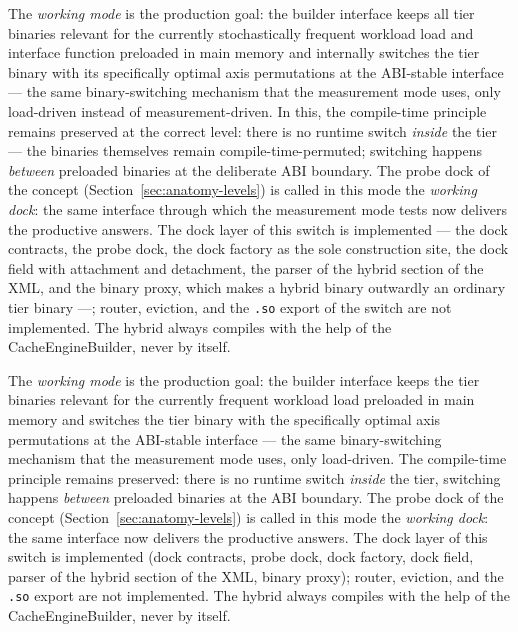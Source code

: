 \begin{nurlang}
The \emph{working mode} is the production goal: the builder interface keeps all tier binaries relevant for the currently
stochastically frequent workload load and interface function preloaded in
main memory and internally switches the tier binary with its specifically optimal
axis permutations at the ABI-stable interface --- the same binary-switching mechanism that the
measurement mode uses, only load-driven instead of measurement-driven. In this, the
compile-time principle remains preserved at the correct level: there is no runtime switch \emph{inside} the tier --- the binaries
themselves remain compile-time-permuted; switching happens \emph{between} preloaded binaries at
the deliberate ABI boundary. The probe dock of the concept (Section~\ref{sec:anatomy-levels}) is called in this
mode the \emph{working dock}: the same interface through which the measurement mode tests now delivers the
productive answers. The dock layer of this switch is implemented --- the dock contracts, the probe dock,
the dock factory as the sole construction site, the dock field with attachment and detachment, the parser
of the hybrid section of the XML, and the binary proxy, which makes a hybrid binary outwardly an ordinary
tier binary ---; router, eviction, and the \texttt{.so} export of the switch are not implemented.
The hybrid always compiles with the help of the CacheEngineBuilder, never by itself.
\end{nurlang}
\begin{nurkurz}
The \emph{working mode} is the production goal: the builder interface keeps the tier binaries relevant
for the currently frequent workload load preloaded in main memory and switches the tier binary with the
specifically optimal axis permutations at the ABI-stable interface --- the same binary-switching
mechanism that the measurement mode uses, only load-driven. The compile-time principle remains
preserved: there is no runtime switch \emph{inside} the tier, switching happens \emph{between}
preloaded binaries at the ABI boundary. The probe dock of the concept
(Section~\ref{sec:anatomy-levels}) is called in this mode the \emph{working dock}: the same interface
now delivers the productive answers. The dock layer of this switch is implemented (dock contracts,
probe dock, dock factory, dock field, parser of the hybrid section of the XML, binary proxy); router,
eviction, and the \texttt{.so} export are not implemented. The hybrid always compiles with the help of
the CacheEngineBuilder, never by itself.
\end{nurkurz}

